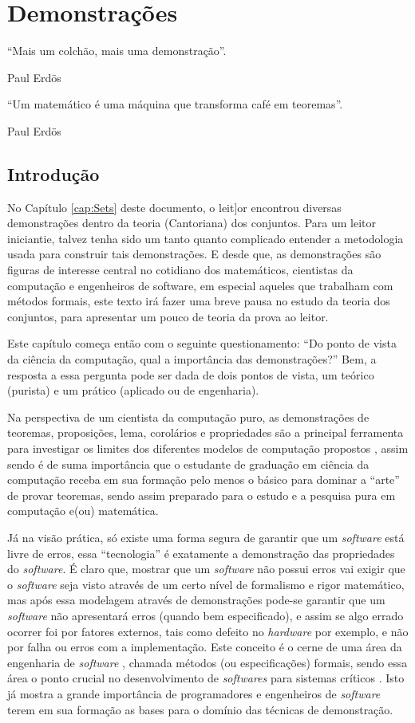 \chapter{Demonstrações}\label{cap:Proofs}

\epigraph{``Mais um colchão, mais uma demonstração''.}{Paul Erdös}

\epigraph{``Um matemático é uma máquina que transforma café em teoremas''.}{Paul Erdös}

\section{Introdução}\label{sec:Introducao}

No Capítulo \ref{cap:Sets} deste documento, o leit]or encontrou diversas demonstrações dentro da teoria (Cantoriana) dos conjuntos. Para um leitor iniciantie, talvez tenha sido um tanto quanto complicado entender a metodologia usada para construir tais demonstrações. E desde que, as demonstrações são figuras de interesse central no cotidiano dos matemáticos, cientistas da computação e engenheiros de software, em especial aqueles que trabalham com métodos formais, este texto irá fazer uma breve pausa no estudo da teoria dos conjuntos, para apresentar um pouco de teoria da prova ao leitor.

Este capítulo começa então com o seguinte questionamento: ``Do ponto de vista da ciência da computação, qual a importância das demonstrações?'' Bem, a resposta a essa pergunta pode ser dada de dois pontos de vista, um teórico (purista) e um prático (aplicado ou de engenharia).

Na perspectiva de um cientista da computação puro, as demonstrações de teoremas, proposições, lema, corolários e propriedades são a principal ferramenta para investigar os limites dos diferentes modelos de computação propostos \cite{hopcroft2008, linz2006}, assim sendo é de suma importância que o estudante de graduação em ciência da computação receba em sua formação pelo menos o básico para dominar a ``arte'' de provar teoremas, sendo assim preparado para o estudo e a pesquisa pura em computação e(ou) matemática.

Já na visão prática, só existe uma forma segura de garantir que um \textit{software} está livre de erros, essa ``tecnologia'' é exatamente a demonstração das propriedades do \textit{software}. É claro que, mostrar que um \textit{software} não possui erros vai exigir que o \textit{software} seja visto através de um certo nível de formalismo e rigor matemático, mas após essa modelagem através de demonstrações pode-se garantir que um \textit{software} não apresentará erros (quando bem especificado), e assim se algo errado ocorrer foi por fatores externos, tais como defeito no \textit{hardware} por exemplo, e não por falha ou erros com a implementação. Este conceito é o cerne de uma área da engenharia de \textit{software} \cite{pressman2016}, chamada métodos  (ou especificações) formais, sendo essa área o ponto crucial no desenvolvimento de \textit{softwares} para sistemas críticos \cite{sommerville2011}. Isto já mostra a grande importância de programadores e engenheiros de \textit{software} terem em sua formação as bases para o domínio das técnicas de demonstração.


